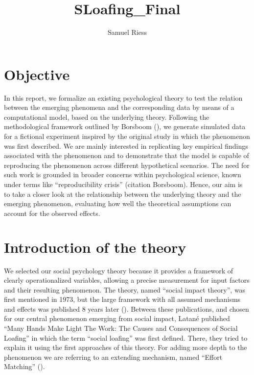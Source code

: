 \documentclass[
  man,
  longtable,
  a4paper,
  nolmodern,
  notxfonts,
  notimes,
  colorlinks=true,linkcolor=blue,citecolor=blue,urlcolor=blue]{apa7}
\title{SLoafing\_Final}
\author{Samuel Riess}
\affiliation{
{Department of Psychology, Ludwig-Maximilians-Universität München,
Munich, Germany}}
\begin{document}
\maketitle




\setlength\LTleft{0pt}




\section{Objective}\label{objective}

In this report, we formalize an existing psychological theory to test
the relation between the emerging phenomena and the corresponding data
by means of a computational model, based on the underlying theory.
Following the methodological framework outlined by Borsboom
(), we generate
simulated data for a fictional experiment inspired by the original study
in which the phenomenon was first described. We are mainly interested in
replicating key empirical findings associated with the phenomenon and to
demonstrate that the model is capable of reproducing the phenomenon
across different hypothetical scenarios. The need for such work is
grounded in broader concerns within psychological science, known under
terms like ``reproducibility crisis'' (citation Borsboom). Hence, our
aim is to take a closer look at the relationship between the underlying
theory and the emerging phenomenon, evaluating how well the theoretical
assumptions can account for the observed effects.

\section{Introduction of the theory}\label{introduction-of-the-theory}

We selected our social psychology theory because it provides a framework
of clearly operationalized variables, allowing a precise measurement for
input factors and their resulting phenomenon. The theory, named ``social
impact theory'', was first mentioned in 1973, but the large framework
with all assumed mechanisms and effects was published 8 years later
(). Between these
publications, and chosen for our central phenomenon emerging from social
impact, Latané published ``Many Hands Make Light The Work: The Causes
and Consequences of Social Loafing'' in which the term ``social
loafing'' was first defined. There, they tried to explain it using the
first approaches of this theory. For adding more depth to the phenomenon
we are referring to an extending mechanism, named ``Effort Matching''
().
\end{document}
